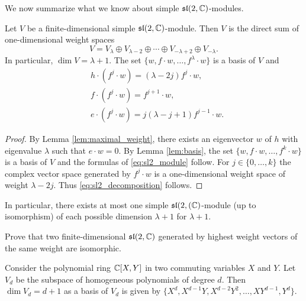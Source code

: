 We now summarize what we know about 
simple $\mathfrak{sl}(2,\mathbb{C})$-modules.

\begin{theorem}
    Let $V$ be a finite-dimensional simple $\mathfrak{sl}(2,\mathbb{C})$-module.
    Then 
    $V$ is the direct sum of one-dimensional weight spaces
    \begin{equation}
    \label{eq:sl2_decomposition}
        V=V_{\lambda}\oplus V_{\lambda-2}\oplus\cdots\oplus V_{-\lambda+2}\oplus V_{-\lambda}.
    \end{equation}
    In particular, $\dim V=\lambda+1$. 
    The set $\{w,f\cdot w,\dots,f^\lambda\cdot w\}$ 
    is a basis of $V$ and 
    \begin{equation}
        \label{eq:sl2_module}
        \begin{aligned}
            &h\cdot (f^j\cdot w)=(\lambda-2j)f^j\cdot w,\\
            &f\cdot (f^j\cdot w)=f^{j+1}\cdot w,\\
            &e\cdot (f^j\cdot w)=j(\lambda-j+1)f^{j-1}\cdot w.
        \end{aligned}
    \end{equation}
\end{theorem}

\begin{proof}
    By Lemma \ref{lem:maximal_weight}, there exists an eigenvector $w$ of $h$ 
    with eigenvalue $\lambda$ such that $e\cdot w=0$. By Lemma \ref{lem:basis}, 
    the set 
    $\{w,f\cdot w,\dots,f^k\cdot w\}$ is a basis of $V$ and
    the formulas of \eqref{eq:sl2_module} follow. For $j\in\{0,\dots,k\}$
    the complex vector space generated by $f^j\cdot w$ 
    is a one-dimensional weight space of weight $\lambda-2j$. Thus \eqref{eq:sl2_decomposition}
    follows. 
\end{proof}

In particular, there exists at most one simple $\mathfrak{sl}(2,(\mathbb{C})$-module (up to isomorphism) 
of each possible dimension $\lambda+1$ for $\lambda+1$. 

\begin{exercise}
    Prove that two 
    finite-dimensional $\mathfrak{sl}(2,\mathbb{C})$ generated by
    highest weight vectors of the same weight are isomorphic. 
\end{exercise}

Consider the polynomial ring $\mathbb{C}[X,Y]$ in two commuting variables
$X$ and $Y$. Let $V_d$ be the subspace of homogeneous polynomials
of degree $d$. Then $\dim V_d=d+1$ 
as a basis of $V_d$ is given 
by $\{X^d,X^{d-1}Y,X^{d-2}Y^2,\dots,XY^{d-1},Y^d\}$. 

